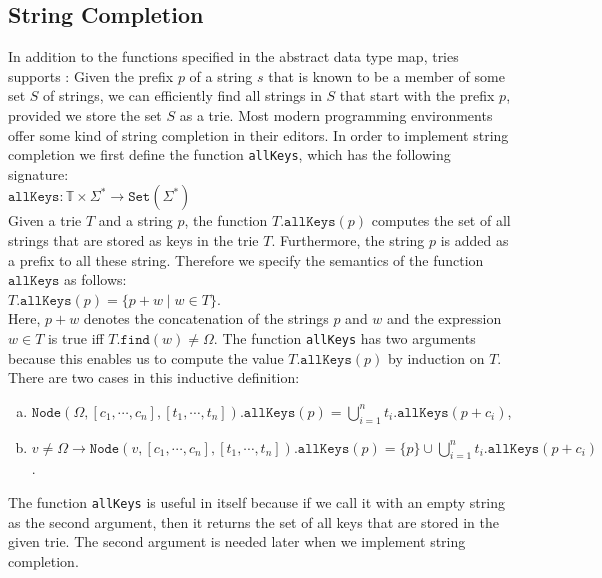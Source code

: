 \subsection{String Completion}
In addition to the functions specified in the abstract data type map, tries supports 
:  Given the prefix $p$ of a string $s$ that is known to be a
member of some set $S$ of strings, we can efficiently find all strings in $S$ that start with the prefix $p$, provided we
store the set $S$ as a trie.  Most modern programming environments offer some kind of string completion in
their editors.  In order to implement string completion we first define the function \texttt{allKeys}, which
has the following signature:
\\[0.2cm]
\hspace*{1.3cm}
$\texttt{allKeys}: \mathbb{T} \times \Sigma^* \rightarrow \texttt{Set}(\Sigma^*)$
\\[0.2cm]
Given a trie $T$ and a string $p$, the function $T.\texttt{allKeys}(p)$ computes the set of all strings that
are stored as keys in the trie $T$.  Furthermore, the string $p$ is added as a prefix to all these string.
Therefore we specify the semantics of the function $\texttt{allKeys}$ as follows:
\\[0.2cm]
\hspace*{1.3cm}
$T.\texttt{allKeys}(p) = \{ p+w \mid w \in T \}$.
\\[0.2cm]
Here, $p+w$ denotes the concatenation of the strings $p$ and $w$ and the expression $w \in T$ is true iff
$T.\texttt{find}(w) \not= \Omega$.  The function \texttt{allKeys} has two arguments because this enables us to
compute the value $T.\texttt{allKeys}(p)$ by induction on $T$.  There are two cases in this inductive definition: 
\begin{enumerate}[(a)]
\item $\texttt{Node}(\Omega, [c_1, \cdots, c_n], [t_1,\cdots,t_n]).\texttt{allKeys}(p) = 
       \bigcup\limits_{i=1}^n t_i.\texttt{allKeys}(p+c_i) 
      $,
\item $v \not= \Omega \rightarrow 
       \texttt{Node}(v, [c_1, \cdots, c_n], [t_1,\cdots,t_n]).\texttt{allKeys}(p) = 
       \{p\} \cup \bigcup\limits_{i=1}^n t_i.\texttt{allKeys}(p+c_i) 
      $.
\end{enumerate}
The function \texttt{allKeys} is useful in itself because if we call it with an empty string as the second
argument, then it returns the set of all keys that are stored in the given trie.  The second argument is needed
later when we implement string completion. 

